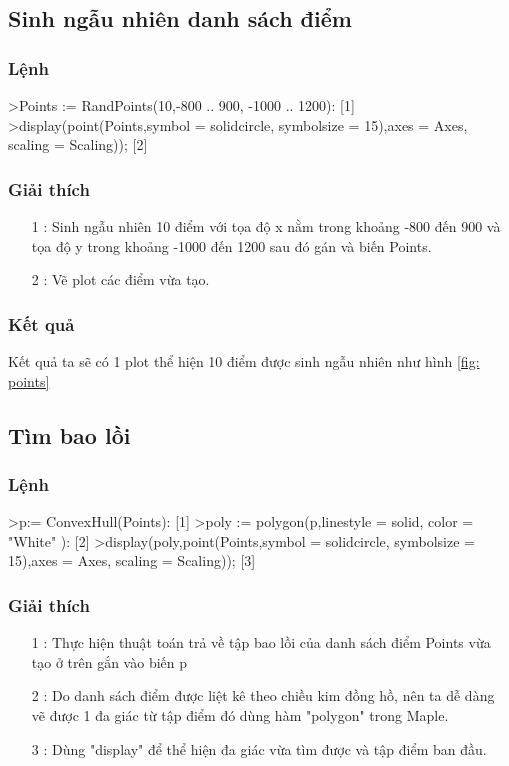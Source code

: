 \documentclass[12pt]{article}
\begin{document}
        \subsection*{Sinh ngẫu nhiên danh sách điểm}
          \subsubsection*{Lệnh}
            \begin{spverbatim}
    >Points := RandPoints(10,-800 .. 900, -1000 .. 1200): [1]
    >display(point(Points,symbol = solidcircle, symbolsize = 15),axes = Axes, scaling = Scaling)); [2]
            \end{spverbatim}
          \subsubsection*{Giải thích}
            \begin{itemize}
              \item [1]: Sinh ngẫu nhiên 10 điểm với tọa độ x nằm trong khoảng -800 đến 900 và tọa độ y trong khoảng -1000 đến 1200 sau đó gán và biến Points.
              \item [2]: Vẽ plot các điểm vừa tạo.
            \end{itemize}
          \subsubsection*{Kết quả} 
            Kết quả ta sẽ có 1 plot thể hiện 10 điểm được sinh ngẫu nhiên như hình \ref{fig: points}
            \newpage
        \subsection*{Tìm bao lồi}
            \subsubsection*{Lệnh}
              \begin{spverbatim}
  >p:= ConvexHull(Points): [1]
  >poly := polygon(p,linestyle = solid, color = "White" ): [2]
  >display(poly,point(Points,symbol = solidcircle, symbolsize = 15),axes = Axes, scaling = Scaling)); [3]
              \end{spverbatim}
            \subsubsection*{Giải thích}
              \begin{itemize}
                \item [1]: Thực hiện thuật toán trả về tập bao lồi của danh sách điểm Points vừa tạo ở trên gắn vào biến p
                \item [2]: Do danh sách điểm được liệt kê theo chiều kim đồng hồ, nên ta dễ dàng vẽ được 1 đa giác từ tập điểm đó dùng hàm "polygon" trong Maple.
                \item [3]: Dùng "display" để thể hiện đa giác vừa tìm được và tập điểm ban đầu.
              \end{itemize}
\end{document}
